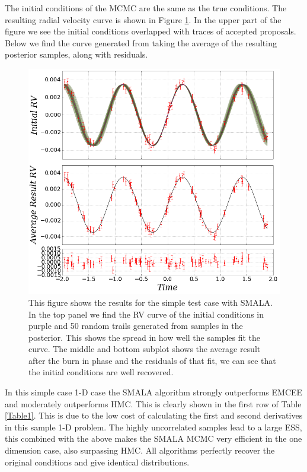 \documentclass{aa}
\begin{document}
The initial conditions of the MCMC are the same as the true conditions. 
The resulting radial velocity curve is shown in Figure \ref{FigSimple}. 
In the upper part of the figure we see the initial conditions overlapped with traces of accepted proposals. 
Below we find the curve generated from taking the average of the resulting posterior samples, along with residuals.

\begin{figure}
\centering
\includegraphics[width=0.95\hsize]{rv1-1.png}
   \caption{This figure shows the results for the simple test case with SMALA. 
In the top panel we find the RV curve of the initial conditions in purple and 50 random trails generated from samples in the posterior. 
This shows the spread in how well the samples fit the curve. 
The middle and bottom subplot shows the average result after the burn in phase and the residuals of that fit, we can see that the initial conditions are well recovered.}
      \label{FigSimple}
\end{figure}

In this simple case 1-D case the SMALA algorithm strongly outperforms EMCEE and moderately outperforms HMC. 
This is clearly shown in the first row of Table \ref{Table1}. This is due to the low cost of calculating the first and second derivatives in this sample 1-D problem. 
The highly uncorrelated samples lead to a large ESS, this combined with the above makes the SMALA MCMC very efficient in the one dimension case, also surpassing HMC. All algorithms perfectly recover the original conditions and give identical distributions.
\end{document}
